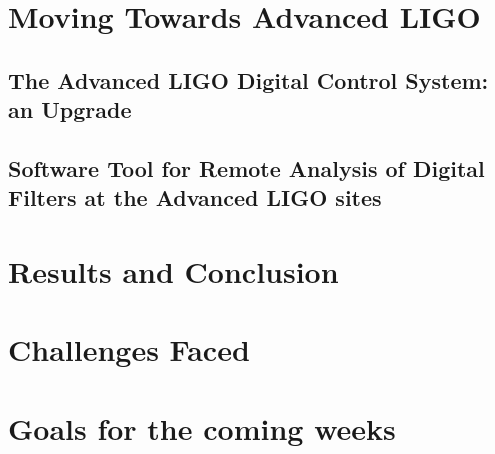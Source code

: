 \documentclass[colorlinks=true,pdfstartview=FitV,linkcolor=blue,
            citecolor=red,urlcolor=magenta]{ligodoc}
\begin{document}
\section{Moving Towards Advanced LIGO}
	\subsection{The Advanced LIGO Digital Control System: an Upgrade}
	\subsection{Software Tool for Remote Analysis of Digital Filters at the Advanced LIGO sites}
	
\section{Results and Conclusion}
\section{Challenges Faced}
\section{Goals for the coming weeks}
\end{document}
